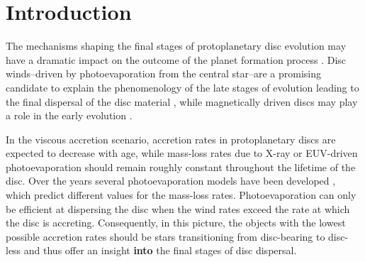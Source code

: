 \documentclass[fleqn,usenatbib]{mnras}
\begin{document}
\section{Introduction}

The mechanisms shaping the final stages of protoplanetary disc evolution may have a dramatic impact on the outcome of the planet formation process \citep[e.g.][]{Ercolano2015, Ercolano2017a, Monsch2019, Jennings2018, Alexander2012, Carrera2017}. Disc winds--driven by photoevaporation from the central star--are a promising candidate to explain the phenomenology of the late stages of evolution leading to the final dispersal of the disc material \citep[e.g.][]{Ercolano2016, Ercolano2017b, Weber2020}, while magnetically driven discs may play a role in the early evolution \citep[e.g.][]{Ercolano2017, Pascucci2022, Lesur2022}. 

In the viscous accretion scenario, accretion rates in protoplanetary discs are expected to decrease with age, while mass-loss rates due to X-ray or EUV-driven photoevaporation should remain roughly constant throughout the lifetime of the disc. Over the years several photoevaporation models have been developed \citep[e.g.][for recent reviews]{Ercolano2017,Ercolano2022}, which predict different values for the mass-loss rates. Photoevaporation can only be efficient at dispersing the disc when the wind rates exceed the rate at which the disc is accreting. Consequently, in this picture, the objects with the lowest possible accretion rates should be stars transitioning from disc-bearing to disc-less and thus offer an insight \textbf{into} the final stages of disc dispersal. 

\end{document}
